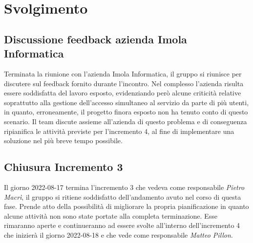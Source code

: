 \section{Svolgimento}
\subsection{Discussione feedback azienda Imola Informatica }
Terminata la riunione con l'azienda Imola Informatica, il gruppo si riunisce per discutere sul feedback fornito durante l'incontro. Nel complesso l'azienda risulta essere soddisfatta del lavoro esposto, evidenziando però alcune criticità relative soprattutto alla gestione dell'accesso simultaneo al servizio da parte di più utenti, in quanto, erroneamente, il progetto finora esposto non ha tenuto conto di questo scenario. \newline
Il team discute assieme all'azienda di questo problema e di conseguenza ripianifica le attività previste per l'incremento 4, al fine di implementare una soluzione nel più breve tempo possibile. 

\subsection{Chiusura Incremento 3}
Il giorno 2022-08-17 termina l'incremento 3 che vedeva come responsabile 
\textit{Pietro Macrì}, il gruppo si ritiene soddisfatto dell'andamento avuto nel corso di questa fase. Prende atto della possibilità di migliorare la propria pianificazione in quanto alcune attività non sono state portate alla completa terminazione. Esse  rimaranno aperte e continueranno ad essere svolte all'interno dell'incremento 4 che inizierà il giorno 2022-08-18 e che vede come responsabile \textit{Matteo Pillon}. 

